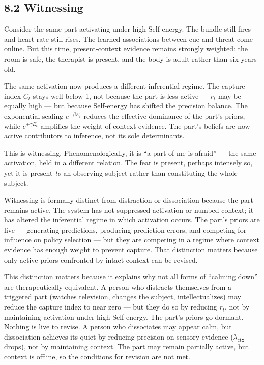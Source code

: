 \documentclass[11pt]{article}
\begin{document}
\subsection{8.2 Witnessing}\label{witnessing}

Consider the same part activating under high Self-energy. The bundle
still fires and heart rate still rises. The learned associations between
cue and threat come online. But this time, present-context evidence
remains strongly weighted: the room is safe, the therapist is present,
and the body is adult rather than six years old.

The same activation now produces a different inferential regime. The
capture index \(C_t\) stays well below 1, not because the part is less
active --- \(r_t\) may be equally high --- but because Self-energy has
shifted the precision balance. The exponential scaling
\(e^{-\beta E_t}\) reduces the effective dominance of the part's priors,
while \(e^{+\gamma E_t}\) amplifies the weight of context evidence. The
part's beliefs are now active contributors to inference, not its sole
determinants.

This is witnessing. Phenomenologically, it is ``a part of me is afraid''
--- the same activation, held in a different relation. The fear is
present, perhaps intensely so, yet it is present \emph{to} an observing
subject rather than constituting the whole subject.

Witnessing is formally distinct from distraction or dissociation because
the part remains active. The system has not suppressed activation or
numbed context; it has altered the inferential regime in which
activation occurs. The part's priors are live --- generating
predictions, producing prediction errors, and competing for influence on
policy selection --- but they are competing in a regime where context
evidence has enough weight to prevent capture. That distinction matters
because only active priors confronted by intact context can be revised.

This distinction matters because it explains why not all forms of
``calming down'' are therapeutically equivalent. A person who distracts
themselves from a triggered part (watches television, changes the
subject, intellectualizes) may reduce the capture index to near zero ---
but they do so by reducing \(r_t\), not by maintaining activation under
high Self-energy. The part's priors go dormant. Nothing is live to
revise. A person who dissociates may appear calm, but dissociation
achieves its quiet by reducing precision on sensory evidence
(\(\lambda_{\text{ctx}}\) drops), not by maintaining context. The part
may remain partially active, but context is offline, so the conditions
for revision are not met.
\end{document}
